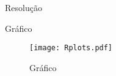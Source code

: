 \documentclass{article}
\begin{document}
\vspace*{-3.5cm}
\huge{\sffamily \color{black}Resolução}
\lstset{style=mystyle}
\vspace{0.1cm}


\vspace{0.1cm}
\huge{\sffamily \color{black}Gráfico}
\nopagebreak
\vspace{0.1cm}
\begin{figure}[!h] %
    \centering %
    \texttt{[image: Rplots.pdf]} %
    \caption{Gráfico} %
    \label{fig:graph} %
\end{figure}
\end{document}
